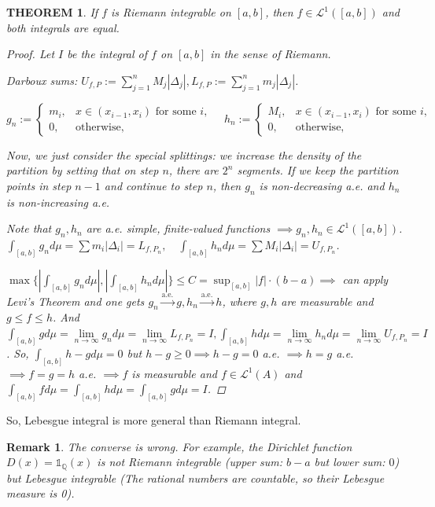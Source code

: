 \documentclass[12pt]{article}
\theoremstyle{blueplain}
\newtheorem{theorem}{THEOREM}[section]
\theoremstyle{bluedef}
\theoremstyle{blueremark}
\newtheorem{remark}{Remark}[section]
\newcommand{\Q}{\mathbb{Q}}
\numberwithin{equation}{section}
\begin{document}
\begin{theorem}
  If $f$ is Riemann integrable on $[a,b]$, then $f \in \mathcal{L}^1([a,b])$ and both integrals are equal.
  \begin{proof}
    Let $I$ be the integral of $f$ on $[a,b]$ in the sense of Riemann.

    Darboux sums: $U_{f,P} := \sum_{j=1}^n M_j |\Delta_j|, L_{f,P} := \sum_{j=1}^n m_j |\Delta_j|$.

    $g_n := \begin{cases} m_i, & x \in (x_{i-1}, x_i) \text{ for some } i, \\ 0, & \text{otherwise}, \end{cases} \quad h_n := \begin{cases} M_i, & x \in (x_{i-1}, x_i) \text{ for some } i, \\ 0, & \text{otherwise}, \end{cases}$

    Now, we just consider the special splittings: we increase the density of the partition by setting that on step $n$, there are $2^n$ segments. If we keep the partition points in step $n-1$ and continue to step $n$, then $g_n$ is non-decreasing a.e. and $h_n$ is non-increasing a.e.

    Note that $g_n, h_n$ are a.e. simple, finite-valued functions $\implies g_n, h_n \in \mathcal{L}^1([a,b])$. $\int_{[a,b]} g_n d \mu = \sum m_i |\Delta_i| = L_{f, P_n}, \quad \int_{[a,b]} h_n d \mu = \sum M_i |\Delta_i| = U_{f, P_n}$.

    $\max{\{|\int_{[a,b]} g_n d\mu|, |\int_{[a,b]} h_n d\mu|\}} \leq C = \sup_{[a,b]} |f| \cdot (b-a) \implies$ can apply Levi's Theorem and one gets $g_n \overset{\text{a.e.}}{\rightarrow} g, h_n \overset{\text{a.e.}}{\rightarrow} h$, where $g,h$ are measurable and $g \leq f \leq h$. And $\int_{[a,b]} g d\mu = \lim\limits_{n \to \infty} g_n d\mu = \lim\limits_{n \to \infty} L_{f, P_n} = I, \int_{[a,b]} h d\mu = \lim\limits_{n \to \infty} h_n d\mu = \lim\limits_{n \to \infty} U_{f, P_n} = I$. So, $\int_{[a,b]} h-g d\mu = 0$ but $h - g \geq 0 \implies h-g = 0$ a.e. $\implies h = g$ a.e. $\implies f = g = h$ a.e. $\implies f$ is measurable and $f \in \mathcal{L}^1(A)$ and $\int_{[a,b]} f d\mu = \int_{[a,b]} h d\mu = \int_{[a,b]} g d\mu = I$.
  \end{proof}
\end{theorem}

So, Lebesgue integral is more general than Riemann integral.

\begin{remark}
  The converse is wrong. For example, the Dirichlet function $D(x) = \mathds{1}_\Q (x)$ is not Riemann integrable (upper sum: $b-a$ but lower sum: $0$) but Lebesgue integrable (The rational numbers are countable, so their Lebesgue measure is 0).
\end{remark}
\end{document}

